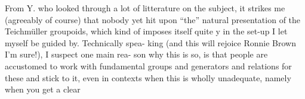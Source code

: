 From Y.  who looked through a lot of litterature on the subject,  it
strikes me (agreeably of course) that nobody yet hit upon ``the'' natural
presentation of the Teichmüller groupoids,  which kind of imposes itself
quite y in the set-up I let myself be guided by.  Technically spea-%
king (and this will rejoice Ronnie Brown I'm sure!),  I suspect one main rea-%
son why this is so,  is that people are accustomed to work with fundamental
groups and generators and relations for these and stick to it,  even in
contexts when this is wholly unadequate,  namely when you get a clear

